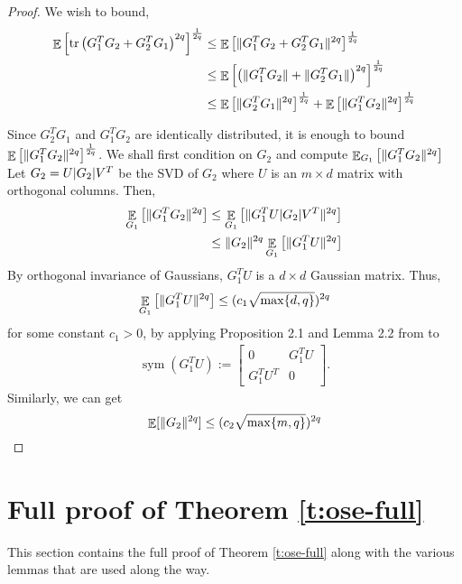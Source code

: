 \documentclass[11pt]{amsart}
\numberwithin{equation}{section}
\numberwithin{equation}{section}
\DeclareMathOperator{\E}{\mathbb{E}}
\DeclareMathOperator*{\tr}{tr}
\DeclareMathOperator{\sym}{sym}
\DeclarePairedDelimiter{\norm}{\lVert}{\rVert}
\DeclarePairedDelimiter{\abs}{\lvert}{\rvert}
\theoremstyle{remark}
\theoremstyle{definition}
\begin{document}
\begin{proof}
    We wish to bound, 
    \begin{align*}
        \E \left[ \tr \left( G_1^TG_2 + G_2^TG_1 \right)^{2q} \right]^\frac{1}{2q} &\le \E \left[ \norm{G_1^TG_2 + G_2^TG_1}^{2q}  \right]^\frac{1}{2q} \\
        &\le \E \left[ \left(\norm{G_1^TG_2} + \norm{G_2^TG_1}\right)^{2q}  \right]^\frac{1}{2q} \\
        &\le \E \left[ \norm{G_2^TG_1}^{2q} \right]^\frac{1}{2q} + \E \left[ \norm{G_1^TG_2}^{2q} \right]^\frac{1}{2q}
    \end{align*}

    Since $G_2^TG_1$ and $G_1^TG_2$ are identically distributed, it is enough to bound $\E \left[ \norm{G_1^TG_2}^{2q} \right]^\frac{1}{2q}$.
    We shall first condition on $G_2$ and compute $\E_{G_1} \left[ \norm{G_1^TG_2}^{2q} \right]$
    Let $G_2 = U \abs{G_2} V^T$ be the SVD of $G_2$ where $U$ is an $m \times d$ matrix with orthogonal columns. Then, 
    \begin{align*}
        \E_{G_1} \left[ \norm{G_1^TG_2}^{2q} \right] &\le \E_{G_1} \left[ \norm{G_1^TU\abs{G_2}V^T}^{2q} \right] \\
        &\le \norm{G_2}^{2q} \E_{G_1} \left[ \norm{G_1^TU}^{2q} \right]
    \end{align*}
    By orthogonal invariance of Gaussians, $G_1^TU$ is a $d \times d$ Gaussian matrix. Thus, 
    \[ \E_{G_1} \left[ \norm{G_1^TU}^{2q} \right] \le (c_1\sqrt{\max\{d, q\}})^{2q}\]
for some constant $c_1>0$, by applying Proposition 2.1 and Lemma 2.2 from \cite{bandeira2016sharp} to 
\begin{align*}\sym(G_1^TU) := \left[ {\begin{array}{*{20}{c}}
0&G_1^TU\\
{{G_1^TU^T}}&0
\end{array}} \right].
\end{align*}
Similarly, we can get
    \[ \E[\norm{G_2}^{2q}] \le (c_2\sqrt{\max\{m, q\}})^{2q} \]
\end{proof}


 \section{Full proof of Theorem \ref{t:ose-full}}\label{sec:osnap-proof}

This section contains the full proof of Theorem  \ref{t:ose-full} along with the various lemmas that are used along the way.
\end{document}
